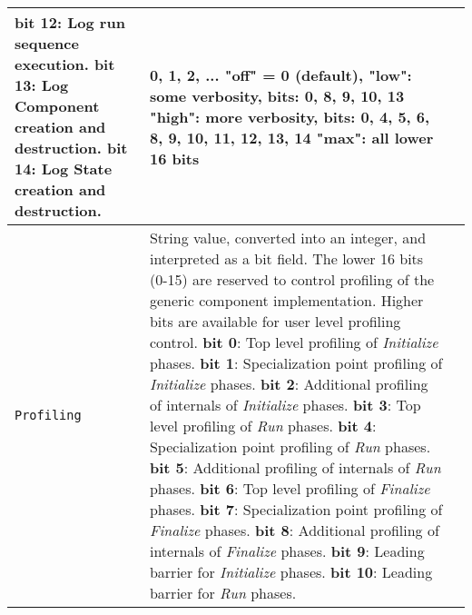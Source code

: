 \begin{longtable}{|p{}|p{}|p{}|}
                       {\bf bit 12}: Log run sequence execution.\newline
                       {\bf bit 13}: Log Component creation and destruction.\newline
                       {\bf bit 14}: Log State creation and destruction.
                     & 0, 1, 2, ... \newline
                       "off" = 0 (default), \newline
                       "low": some verbosity, bits: 0, 8, 9, 10, 13\newline
                       "high": more verbosity, bits: 0, 4, 5, 6, 8, 9, 10, 11, 12, 13, 14\newline
                       "max": all lower 16 bits\\ \hline
     {\tt Profiling} & String value, converted into an integer, and interpreted as a bit field. The lower 16 bits (0-15) are reserved to control profiling of the generic component implementation. Higher bits are available for user level profiling control. \newline
                       {\bf bit 0}: Top level profiling of {\em Initialize} phases.\newline
                       {\bf bit 1}: Specialization point profiling of {\em Initialize} phases.\newline
                       {\bf bit 2}: Additional profiling of internals of {\em Initialize} phases.\newline
                       {\bf bit 3}: Top level profiling of {\em Run} phases.\newline
                       {\bf bit 4}: Specialization point profiling of {\em Run} phases.\newline
                       {\bf bit 5}: Additional profiling of internals of {\em Run} phases.\newline
                       {\bf bit 6}: Top level profiling of {\em Finalize} phases.\newline
                       {\bf bit 7}: Specialization point profiling of {\em Finalize} phases.\newline
                       {\bf bit 8}: Additional profiling of internals of {\em Finalize} phases.\newline
                       {\bf bit 9}: Leading barrier for {\em Initialize} phases.\newline
                       {\bf bit 10}: Leading barrier for {\em Run} phases.\newline

\end{longtable}
